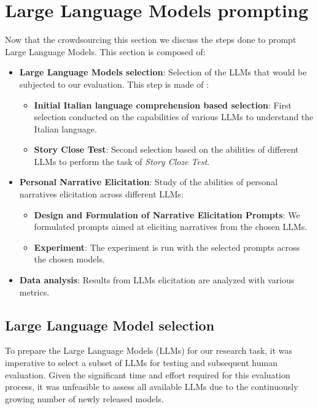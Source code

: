\section{Large Language Models prompting}
Now that the crowdsourcing this section we discuss the steps done to prompt Large Language Models. This section is composed of:
\begin{itemize}
    \item \textbf{Large Language Models selection}: Selection of the LLMs that would be subjected to our evaluation. This step is made of :
    \begin{itemize}
        \item \textbf{Initial Italian language comprehension based selection}: First selection conducted on the capabilities of various LLMs to understand the Italian language.
        \item \textbf{Story Close Test}: Second selection based on the abilities of different LLMs to perform the task of \emph{Story Cloze Test}.
    \end{itemize}
    \item \textbf{Personal Narrative Elicitation}: Study of the abilities of personal narratives elicitation across different LLMs:
    \begin{itemize}
        \item \textbf{Design and Formulation of Narrative Elicitation Prompts}: We formulated prompts aimed at eliciting narratives from the chosen LLMs.
        \item \textbf{Experiment}: The experiment is run with the selected prompts across the chosen models.
    \end{itemize}
    \item \textbf{Data analysis}: Results from LLMs elicitation are analyzed with various metrics.
\end{itemize}
\subsection{Large Language Model selection}
To prepare the Large Language Models (LLMs) for our research task, it was imperative to select a subset of LLMs for testing and subsequent human evaluation. Given the significant time and effort required for this evaluation process, it was unfeasible to assess all available LLMs due to the continuously growing number of newly released models.


